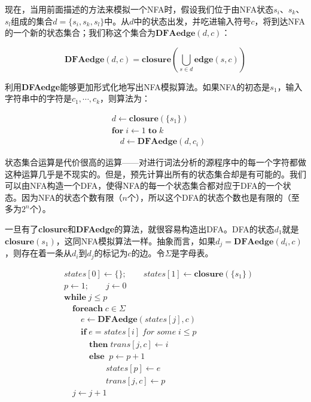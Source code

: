 \documentclass[cn,11pt,chinese]{elegantbook}
\begin{document}
现在，当用前面描述的方法来模拟一个NFA时，假设我们位于由NFA状态$s_i$、$s_k$、$s_l$组成的集合$d=\{s_i,s_k,s_l\}$中。从$d$中的状态出发，并吃进输入符号$c$，将到达NFA的一个新的状态集合；我们称这个集合为$\textbf{DFAedge}(d,c)$：

$$
\textbf{DFAedge}(d,c)=\textbf{closure}(\bigcup_{s \in d} \textbf{edge}(s,c))
$$

利用\textbf{DFAedge}能够更加形式化地写出NFA模拟算法。如果NFA的初态是$s_1$，输入字符串中的字符是$c_1,\cdots,c_k$，则算法为：

\begin{align*}
& d \leftarrow \textbf{closure}(\{s_1\}) \\
& \textbf{for} \; \textit{i} \leftarrow 1 \;\textbf{to}\; \textit{k} \\
& \quad d \leftarrow \textbf{DFAedge}(d,c_i)
\end{align*}

状态集合运算是代价很高的运算——对进行词法分析的源程序中的每一个字符都做这种运算几乎是不现实的。但是，预先计算出所有的状态集合却是有可能的。我们可以由NFA构造一个DFA，使得NFA的每一个状态集合都对应于DFA的一个状态。因为NFA的状态个数有限（$n$个），所以这个DFA的状态个数也是有限的（至多为$2^n$个）。

一旦有了\textbf{closure}和\textbf{DFAedge}的算法，就很容易构造出DFA。DFA的状态$d_1$就是$\textbf{closure}(s_1)$，这同NFA模拟算法一样。抽象而言，如果$d_j=\textbf{DFAedge}(d_i,c)$，则存在着一条从$d_i$到$d_j$的标记为$c$的边。令$\Sigma$是字母表。

\begin{align*}
& states[0] \leftarrow \{\}; \quad\quad states[1] \leftarrow \textbf{closure}(\{s_1\}) \\
& p \leftarrow 1; \quad\quad j \leftarrow 0 \\
& \textbf{while} \; j \leq p \\
& \quad \textbf{foreach} \; c \in \Sigma \\
& \quad\quad e \leftarrow \textbf{DFAedge}(states[j],c) \\
& \quad\quad \textbf{if} \; e = states[i] \; for \; some \; i \leq p \\
& \quad\quad\quad \textbf{then} \; trans[j,c] \leftarrow i \\
& \quad\quad\quad \textbf{else} \;\; p \leftarrow p + 1 \\
& \quad\quad\quad\quad\quad states[p] \leftarrow e \\
& \quad\quad\quad\quad\quad trans[j,c] \leftarrow p \\
& \quad j \leftarrow j + 1
\end{align*}
\end{document}
